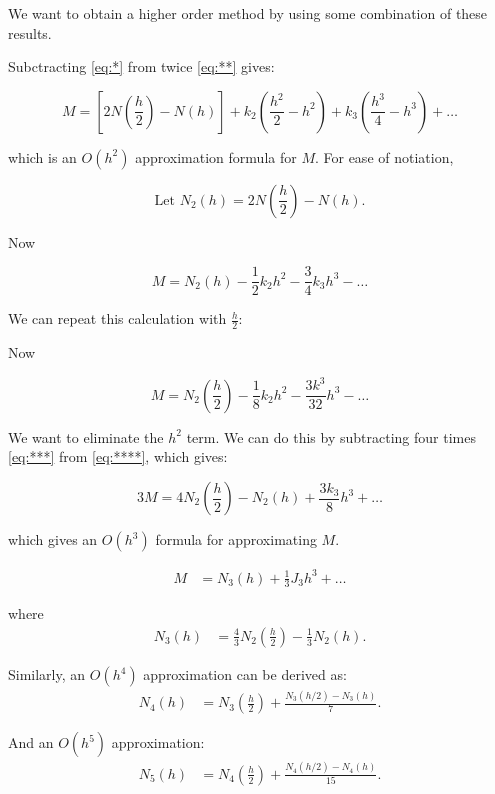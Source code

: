 \documentclass[12pt]{article}
\begin{document}
We want to obtain a higher order method by using some combination of these
results. 

Subctracting \eqref{eq:*} from twice \eqref{eq:**} gives:

\begin{equation}
  M = [2N(\frac{h}{2}) - N(h)] + k_2(\frac{h^2}{2} - h^2) + k_3
  (\frac{h^3}{4}-h^3) + \dots
  \label{eq:?}
\end{equation}

which is an $O(h^2)$ approximation formula for $M$. For ease of notiation, 

\[
\text{Let } N_2(h) = 2N(\frac{h}{2}) - N(h)
.\]

Now 

\begin{equation}
  M = N_2(h) - \frac{1}{2} k_2 h^2 - \frac{3}{4} k_3 h^3 - \dots
  \label{eq:***}
\end{equation}

We can repeat this calculation with $\frac{h}{2}$:

Now 

\begin{equation}
  M = N_2(\frac{h}{2}) -\frac{1}{8} k_2 h^2 - \frac{3k^3}{32}h^3 - \dots
  \label{eq:****}
  \end{equation}

We want to eliminate the $h^2$ term. We can do this by subtracting four times 
\eqref{eq:***} from \eqref{eq:****}, which gives:

\begin{equation}
  3M = 4N_2(\frac{h}{2}) -N_2(h) + \frac{3k_3}{8}h^3 + \dots
  \label{eq:???}
\end{equation}

which gives an $O(h^3)$ formula for approximating $M$. 

\begin{align*}
    M &= N_3(h) + \frac{1}{3} J_3 h^3 + \dots
\end{align*}

where
\begin{align*}
    N_3(h) &= \frac{4}{3} N_2 \left(\frac{h}{2}\right) - \frac{1}{3} N_2(h).
\end{align*}

Similarly, an \( O(h^4) \) approximation can be derived as:
\begin{align*}
    N_4(h) &= N_3 \left(\frac{h}{2}\right) + \frac{N_3(h/2) - N_3(h)}{7}.
\end{align*}

And an \( O(h^5) \) approximation:
\begin{align*}
    N_5(h) &= N_4 \left(\frac{h}{2}\right) + \frac{N_4(h/2) - N_4(h)}{15}.
\end{align*}
\end{document}
